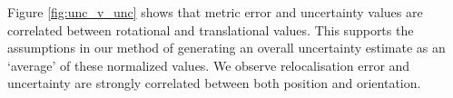 Figure \ref{fig:unc_v_unc} shows that metric error and uncertainty values are correlated between rotational and translational values. This supports the assumptions in our method of generating an overall uncertainty estimate as an `average' of these normalized values. We observe relocalisation error and uncertainty are strongly correlated between both position and orientation.

\begin{figure}[p]
\clearpage
\begin{center}
    

\end{center}
\end{figure}
